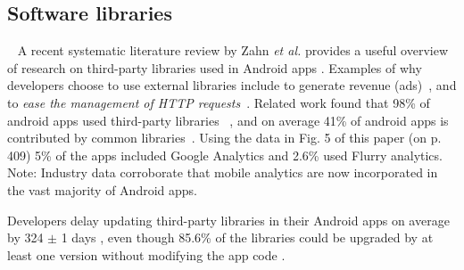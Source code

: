\subsection{Software libraries}~\label{rw-software-libraries-topic}
A recent systematic literature review by Zahn \emph{et al.} provides a useful overview of research on third-party libraries used in Android apps .
%
Examples of why developers choose to use external libraries include to generate revenue (ads)~, and to \emph{ease the management of HTTP requests}~. Related work found that 98\% of android apps used third-party libraries ~, and on average 41\% of android apps is contributed by common libraries~. Using the data in Fig. 5 of this paper (on p. 409) 5\% of the apps included Google Analytics and 2.6\% used Flurry analytics. 
%
Note: Industry data corroborate that mobile analytics are now incorporated in the vast majority of Android apps. %

Developers delay updating third-party libraries in their Android apps on average by 324 $\pm$ 1 days , %
even though 85.6\% of the libraries could be upgraded by at least one version without modifying the app code .


